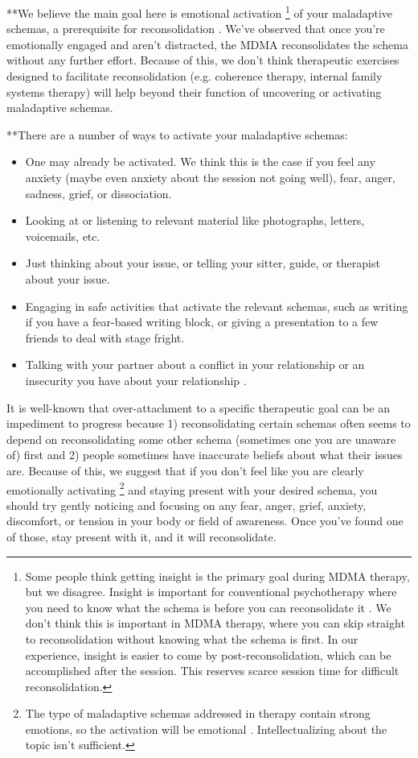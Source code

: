 \documentclass[12pt,letterpaper]{book}
\begin{document}
**We believe the main goal here is emotional activation \footnote{Some people think getting insight is the primary goal during MDMA therapy, but we disagree. Insight is important for conventional psychotherapy where you need to know what the schema is before you can reconsolidate it \cite{eckerUnlocking}. We don't think this is important in MDMA therapy, where you can skip straight to reconsolidation without knowing what the schema is first. In our experience, insight is easier to come by post-reconsolidation, which can be accomplished after the session. This reserves scarce session time for difficult reconsolidation.} of your maladaptive schemas, a prerequisite for reconsolidation \cite{eckerUnlocking}. We've observed that once you're emotionally engaged and aren't distracted, the MDMA reconsolidates the schema without any further effort. Because of this, we don't think therapeutic exercises designed to facilitate reconsolidation (e.g. coherence therapy, internal family systems therapy) will help beyond their function of uncovering or activating maladaptive schemas.

**There are a number of ways to activate your maladaptive schemas:
\begin{itemize}
    \item One may already be activated. We think this is the case if you feel any anxiety (maybe even anxiety about the session not going well), fear, anger, sadness, grief, or dissociation.
    \item Looking at or listening to relevant material like photographs, letters, voicemails, etc.
    \item Just thinking about your issue, or telling your sitter, guide, or therapist about your issue.
    \item Engaging in safe activities that activate the relevant schemas, such as writing if you have a fear-based writing block, or giving a presentation to a few friends to deal with stage fright.
    \item Talking with your partner about a conflict in your relationship or an insecurity you have about your relationship \cite{colbertEvenings}.
\end{itemize}
It is well-known that over-attachment to a specific therapeutic goal can be an impediment to progress because 1) reconsolidating certain schemas often seems to depend on reconsolidating some other schema (sometimes one you are unaware of) first and 2) people sometimes have inaccurate beliefs about what their issues are. Because of this, we suggest that if you don't feel like you are clearly emotionally activating \footnote{The type of maladaptive schemas addressed in therapy contain strong emotions, so the activation will be emotional \cite{eckerUnlocking}. Intellectualizing about the topic isn't sufficient.} and staying present with your desired schema, you should try gently noticing and focusing on any fear, anger, grief, anxiety, discomfort, or tension in your body or field of awareness. Once you've found one of those, stay present with it, and it will reconsolidate.
\end{document}
